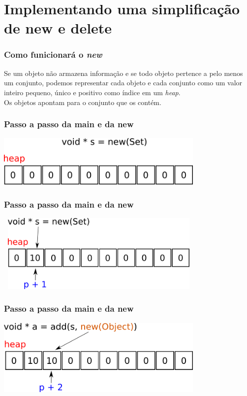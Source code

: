 \documentclass{beamer}
\begin{document}
\section{Implementando uma simplificação de new e delete}
\begin{frame}
 \frametitle{Como funicionará o \textit{new}}
  Se um objeto não armazena informação e se todo objeto pertence a pelo menos 
  um conjunto, podemos representar cada objeto e cada conjunto como um valor 
  inteiro pequeno, único e positivo como índice em um \textit{heap}. \\
  Os objetos apontam para o conjunto que os contém.
\end{frame}

\begin{frame}
 \frametitle{Passo a passo da main e da new}
  \begin{center}
    \includegraphics[height = 1in, width = 4in]{image/new_set.png}
  \end{center}
\end{frame}

\begin{frame}
 \frametitle{Passo a passo da main e da new}
  \begin{center}
    \includegraphics[height = 1.5in, width = 4in]{image/new_set2.png}
  \end{center}
\end{frame}


\begin{frame}
 \frametitle{Passo a passo da main e da new}
  \begin{center}
    \includegraphics[height = 1.5in, width = 4in]{image/add_a1.png}
  \end{center}
\end{frame}
\end{document}
